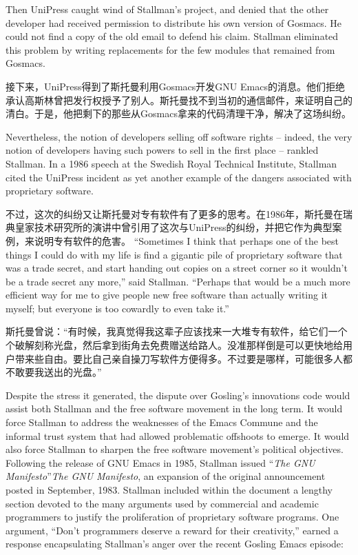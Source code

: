 \ifdefined\eng
Then UniPress caught wind of Stallman's project, and denied that the other developer had received permission to distribute his own version of Gosmacs.  He could not find a copy of the old email to defend his claim.  Stallman eliminated this problem by writing replacements for the few modules that remained from Gosmacs.
\fi

\ifdefined\chs
接下来，UniPress得到了斯托曼利用Gosmacs开发GNU Emacs的消息。他们拒绝承认高斯林曾把发行权授予了别人。斯托曼找不到当初的通信邮件，来证明自己的清白。于是，他把剩下的那些从Gosmacs拿来的代码清理干净，解决了这场纠纷。
\fi

\ifdefined\eng
Nevertheless, the notion of developers selling off software rights -- indeed, the very notion of developers having such powers to sell in the first place -- rankled Stallman. In a 1986 speech at the Swedish Royal Technical Institute, Stallman cited the UniPress incident as yet another example of the dangers associated with proprietary software.
\fi

\ifdefined\chs
不过，这次的纠纷又让斯托曼对专有软件有了更多的思考。在1986年，斯托曼在瑞典皇家技术研究所的演讲中曾引用了这次与UniPress的纠纷，并把它作为典型案例，来说明专有软件的危害。
\fi
\fi
\ifdefined\eng
``Sometimes I think that perhaps one of the best things I could do with my life is find a gigantic pile of proprietary software that was a trade secret, and start handing out copies on a street corner so it wouldn't be a trade secret any more,'' said Stallman. ``Perhaps that would be a much more efficient way for me to give people new free software than actually writing it myself; but everyone is too cowardly to even take it.''
\fi

\ifdefined\chs
斯托曼曾说：``有时候，我真觉得我这辈子应该找来一大堆专有软件，给它们一个个破解刻称光盘，然后拿到街角去免费赠送给路人。没准那样倒是可以更快地给用户带来些自由。要比自己亲自操刀写软件方便得多。不过要是哪样，可能很多人都不敢要我送出的光盘。''
\fi

\ifdefined\eng
Despite the stress it generated, the dispute over Gosling's \ifdefined\vone innovations \fi\ifdefined\vtwo code \fi would assist both Stallman and the free software movement in the long term. It would force Stallman to address the weaknesses of the Emacs Commune and the informal trust system that had allowed problematic offshoots to emerge. It would also force Stallman to sharpen the free software movement's political objectives. Following the release of GNU Emacs in 1985, Stallman issued \ifdefined\vone ``\textit{The GNU Manifesto}''\fi\ifdefined\vtwo \textit{The GNU Manifesto}\fi, an expansion of the original announcement posted in September, 1983. Stallman included within the document a lengthy section devoted to the many arguments used by commercial and academic programmers to justify the proliferation of proprietary software programs. One argument, ``Don't programmers deserve a reward for their creativity,'' earned a response encapsulating Stallman's anger over the recent Gosling Emacs episode:
\fi


